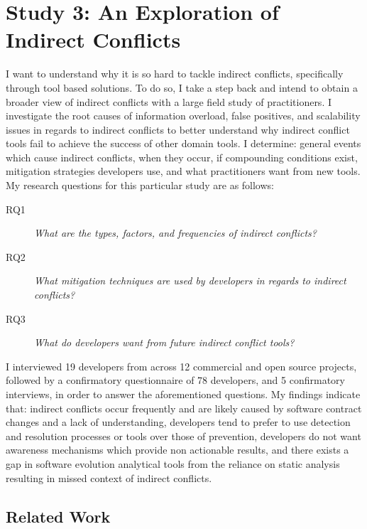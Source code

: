 \section{Study 3: An Exploration of Indirect Conflicts}
\label{study:exploration}

I want to understand why it is so hard to tackle indirect conflicts, specifically through tool based solutions.
To do so, I take a step back and intend to obtain a broader view of indirect conflicts
with a large field study of practitioners. I investigate the root causes of information overload, false positives, and
scalability issues in regards to indirect conflicts to better understand why indirect conflict tools fail to achieve
the success of other domain tools. I determine: general events which 
cause indirect conflicts, when they occur, if compounding conditions exist, mitigation strategies developers
use, and what practitioners want from new tools. My research questions for this particular study are as follows:

\begin{description}
        \item[RQ1] \textit{What are the types, factors, and frequencies of indirect conflicts?}
        \item[RQ2] \textit{What mitigation techniques are used by developers in regards to indirect conflicts?}
        \item[RQ3] \textit{What do developers want from future indirect conflict tools?}
\end{description}

I interviewed 19 developers from across 12 commercial and open source projects, followed by a confirmatory questionnaire of 78 
developers, and 5 confirmatory interviews, in order to answer the aforementioned questions. My findings indicate that: 
indirect conflicts occur frequently and are likely caused by software contract changes and a lack of understanding,
developers tend to prefer to use detection and resolution processes or tools
over those of prevention, developers do not want awareness mechanisms which provide non actionable results, 
and there exists a gap in software evolution analytical tools from the reliance on static analysis resulting in missed
context of indirect conflicts.

\subsection{Related Work}
\label{sec:iced-related}

